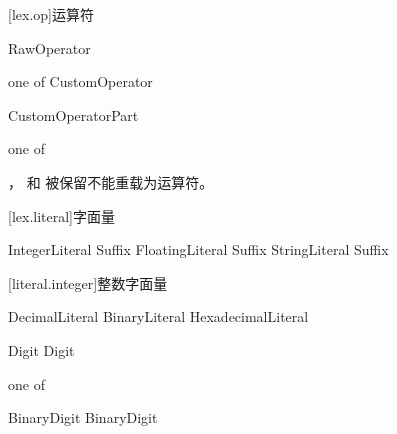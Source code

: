 [lex.op]{运算符}

\begin{bnf}
 \br
    \terminal{\lq}\bnfq RawOperator
\end{bnf}

\begin{bnf}
 \textnormal{one of} \br
    CustomOperator \terminal{, ; : ( ) [ ] \{ \}}
\end{bnf}

\begin{bnf}
 \br
    CustomOperatorPart\bnfp
\end{bnf}

\begin{bnf}
 \textnormal{one of} \br
\end{bnf}

\pnum
{}， 和 \tcode{=} 被保留不能重载为运算符。

[lex.literal]{字面量}

\begin{bnf}
 \br
    IntegerLiteral Suffix\bnfq \br
    FloatingLiteral Suffix\bnfq \br
    StringLiteral Suffix\bnfq
\end{bnf}

[literal.integer]{整数字面量}

\begin{bnf}
 \br
    DecimalLiteral \br
    BinaryLiteral \br
    HexadecimalLiteral
\end{bnf}

\begin{bnf}
 \br
    Digit \bnflp\terminal{\textquotesingle}\bnfq Digit\bnfrp\bnfs
\end{bnf}

\begin{bnf}
 \textnormal{one of} \br
\end{bnf}

\begin{bnf}
 \br
     BinaryDigit \bnflp\terminal{\textquotesingle}\bnfq BinaryDigit\bnfrp\bnfs
\end{bnf}

\begin{bnf}
 \br
     \br
\end{bnf}

